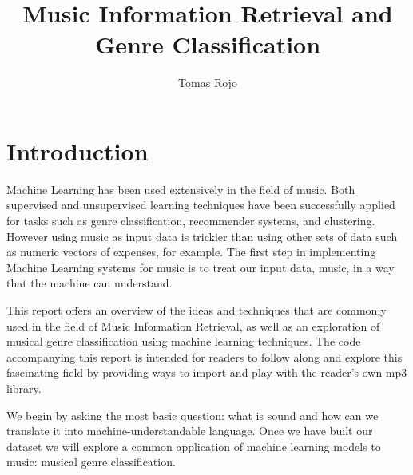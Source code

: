 \documentclass[12pt]{article}
\title{\textbf{Music Information Retrieval and Genre Classification} }
\author{Tomas Rojo}
\date{} %
\begin{document}

\baselineskip8pt


\maketitle 










\section*{Introduction}

Machine Learning has been used extensively in the field of music. Both supervised and unsupervised learning techniques have been successfully applied for tasks such as genre classification, recommender systems, and clustering. However using music as input data is trickier than using other sets of data such as numeric vectors of expenses, for example. The first step in implementing Machine Learning systems for music is to treat our input data, music, in a way that the machine can understand.
\medskip

This report offers an overview of the ideas and techniques that are commonly used in the field of Music Information Retrieval, as well as an exploration of musical genre classification using machine learning techniques. The code accompanying this report is intended for readers to follow along and explore this fascinating field by providing ways to import and play with the reader's own mp3 library.
\medskip

We begin by asking the most basic question: what is sound and how can we translate it into machine-understandable language. Once we have built our dataset we will explore a common application of machine learning models to music: musical genre classification.
\medskip
\end{document}
